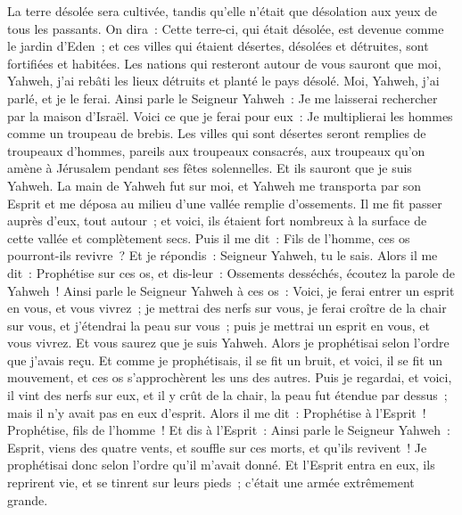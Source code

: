 \begin{multicols}{2}
La terre désolée sera cultivée, tandis qu'elle n'était que désolation aux yeux de tous les passants.
On dira~: Cette terre-ci, qui était désolée, est devenue comme le jardin d'Eden~; et ces villes qui étaient désertes, désolées et détruites, sont fortifiées et habitées.
Les nations qui resteront autour de vous sauront que moi, Yahweh, j'ai rebâti les lieux détruits et planté le pays désolé. Moi, Yahweh, j'ai parlé, et je le ferai.
Ainsi parle le Seigneur Yahweh~: Je me laisserai rechercher par la maison d'Israël. Voici ce que je ferai pour eux~: Je multiplierai les hommes comme un troupeau de brebis.
Les villes qui sont désertes seront remplies de troupeaux d'hommes, pareils aux troupeaux consacrés, aux troupeaux qu'on amène à Jérusalem pendant ses fêtes solennelles. Et ils sauront que je suis Yahweh.
\VerseOne{}La main de Yahweh fut sur moi, et Yahweh me transporta par son Esprit et me déposa au milieu d'une vallée remplie d'ossements.
Il me fit passer auprès d'eux, tout autour~; et voici, ils étaient fort nombreux à la surface de cette vallée et complètement secs.
Puis il me dit~: Fils de l'homme, ces os pourront-ils revivre~? Et je répondis~: Seigneur Yahweh, tu le sais.
Alors il me dit~: Prophétise sur ces os, et dis-leur~: Ossements desséchés, écoutez la parole de Yahweh~!
Ainsi parle le Seigneur Yahweh à ces os~: Voici, je ferai entrer un esprit en vous, et vous vivrez~;
je mettrai des nerfs sur vous, je ferai croître de la chair sur vous, et j'étendrai la peau sur vous~; puis je mettrai un esprit en vous, et vous vivrez. Et vous saurez que je suis Yahweh.
Alors je prophétisai selon l'ordre que j'avais reçu. Et comme je prophétisais, il se fit un bruit, et voici, il se fit un mouvement, et ces os s'approchèrent les uns des autres.
Puis je regardai, et voici, il vint des nerfs sur eux, et il y crût de la chair, la peau fut étendue par dessus~; mais il n'y avait pas en eux d'esprit.
Alors il me dit~: Prophétise à l'Esprit~! Prophétise, fils de l'homme~! Et dis à l'Esprit~: Ainsi parle le Seigneur Yahweh~: Esprit, viens des quatre vents, et souffle sur ces morts, et qu'ils revivent~!
Je prophétisai donc selon l'ordre qu'il m'avait donné. Et l'Esprit entra en eux, ils reprirent vie, et se tinrent sur leurs pieds~; c'était une armée extrêmement grande.

\end{multicols}

